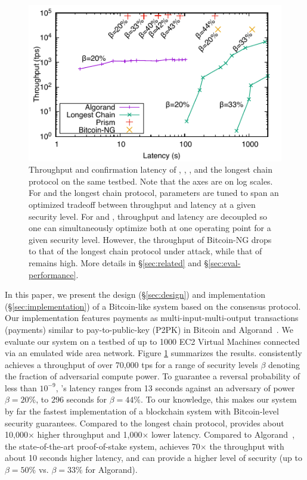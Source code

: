 \begin{figure} 
    \centering
    \includegraphics{figures/compare-fig.pdf}
    \caption{\small Throughput and confirmation latency of \prism, \algorand, \bng, and the longest chain protocol on the same testbed. Note that the axes are on log scales. For \algorand and the longest chain protocol, parameters are tuned to span an optimized tradeoff between throughput and latency at a given security level. For \bng and \prism, throughput and latency are decoupled so one can simultaneously optimize both at one operating point for a given security level. However, the throughput of Bitcoin-NG drops to that of the longest chain protocol under attack, while that of \prism remains high. More details in \S\ref{sec:related} and \S\ref{sec:eval-performance}. }
    \label{fig:compare}
    \vspace{-5mm}
\end{figure}


In this paper, we present the design (\S\ref{sec:design}) and  implementation (\S\ref{sec:implementation}) of a Bitcoin-like system based on the \prism consensus protocol. Our implementation features payments as multi-input-multi-output transactions (payments) similar to pay-to-public-key (P2PK) in Bitcoin and Algorand~\cite{algorand, algorandcode}. We evaluate our system on a testbed of up to 1000 EC2 Virtual Machines connected via an emulated wide area network. Figure \ref{fig:compare} summarizes the results. \prism consistently achieves a throughput of over 70,000 tps for a range of security levels $\beta$ denoting the fraction of adversarial compute power.  To guarantee a reversal probability of less than $10^{-9}$, \prism's latency ranges from 13 seconds against an adversary of power $\beta = 20\%$, to $296$ seconds for $\beta = 44\%$. To our knowledge, this makes our system by far the fastest  implementation of a blockchain system with Bitcoin-level security guarantees. Compared to the longest chain protocol, \prism provides about 10,000$\times$ higher throughput and 1,000$\times$ lower latency. Compared to Algorand~\cite{algorand}, the state-of-the-art proof-of-stake system, \prism achieves 70$\times$ the throughput with about 10 seconds higher latency, and can provide a higher level of security  (up to $\beta = 50\%$ vs. $\beta=33\%$ for Algorand).


